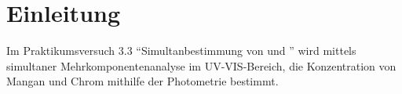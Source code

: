 %
\pagebreak
\section{Einleitung}
\label{sec:einleitung}
Im Praktikumsversuch 3.3 "`Simultanbestimmung von  und "' wird mittels simultaner Mehrkomponentenanalyse im UV-VIS-Bereich, die Konzentration von Mangan und Chrom mithilfe der Photometrie bestimmt.





